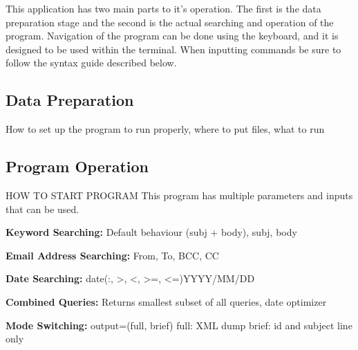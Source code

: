 This application has two main parts to it's operation.  The first is the data preparation stage
and the second is the actual searching and operation of the program.  Navigation of the program
can be done using the keyboard, and it is designed to be used within the terminal.  When 
inputting commands be sure to follow the syntax guide described below. 

\subsection{Data Preparation}
How to set up the program to run properly, where to put files, what to run

\subsection{Program Operation}
HOW TO START PROGRAM
This program has multiple parameters and inputs that can be used.

\textbf{Keyword Searching: }
Default behaviour (subj + body), subj, body

\textbf{Email Address Searching: }
From, To, BCC, CC

\textbf{Date Searching: }
date(:, >, <, >=, <=)YYYY/MM/DD

\textbf{Combined Queries: }
Returns smallest subset of all queries, date optimizer

\textbf{Mode Switching: }
output=(full, brief)
full: XML dump
brief: id and subject line only
